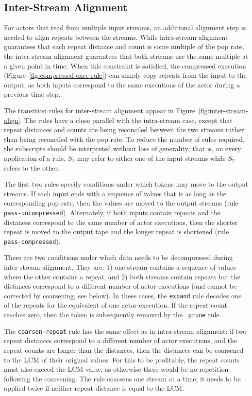 \subsection{Inter-Stream Alignment}

For actors that read from multiple input streams, an additional
alignment step is needed to align repeats between the streams.  While
intra-stream alignment guarantees that each repeat distance and count
is some multiple of the pop rate, the inter-stream alignment
guarantees that both streams use the same multiple at a given point in
time.  When this constraint is satisfied, the compressed execution
(Figure~\ref{fig:compressed-exec-rule}) can simply copy repeats from
the input to the output, as both inputs correspond to the same
executions of the actor during a previous time step.

The transition rules for inter-stream alignment appear in
Figure~\ref{fig:inter-stream-align}.  The rules have a close parallel
with the intra-stream case, except that repeat distances and counts
are being reconciled between the two streams rather than being
reconciled with the pop rate.  To reduce the number of rules required,
the subscripts should be interpreted without loss of generality; that
is, on every application of a rule, $S_1$ may refer to either one of
the input streams while $S_2$ refers to the other.

The first two rules specify conditions under which tokens may move to
the output streams.  If each input ends with a sequence of values that
is as long as the corresponding pop rate, then the values are moved to
the output streams (rule {\tt pass-uncompressed}).  Alternately, if
both inputs contain repeats and the distances correspond to the same
number of actor executions, then the shorter repeat is moved to the
output tape and the longer repeat is shortened (rule {\tt
pass-compressed}).

There are two conditions under which data needs to be decompressed
during inter-stream alignment.  They are: 1) one stream contains a
sequence of values where the other contains a repeat, and 2) both
streams contain repeats but the distances correspond to a different
number of actor executions (and cannot be corrected by coarsening, see
below).  In these cases, the {\tt expand} rule decodes one of the
repeats for the equivalent of one actor execution.  If the repeat
count reaches zero, then the token is subsequently removed by the {\tt
prune} rule.

The {\tt coarsen-repeat} rule has the same effect as in intra-stream
alignment: if two repeat distances correspond to a different number of
actor executions, and the repeat counts are longer than the distances,
then the distances can be coarsened to the LCM of their original
values.  For this to be profitable, the repeat counts must also exceed
the LCM value, as otherwise there would be no repetition following the
coarsening.  The rule coarsens one stream at a time; it needs to be
applied twice if neither repeat distance is equal to the LCM.

